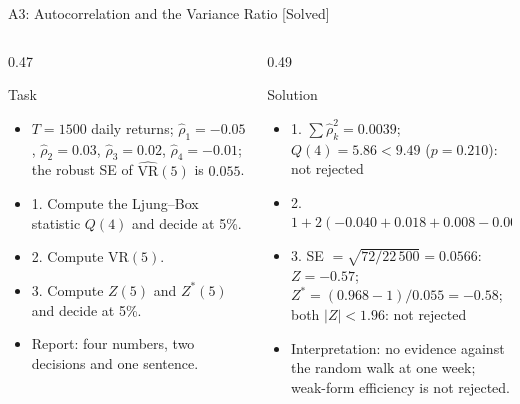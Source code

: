 \begin{frame}{A3: Autocorrelation and the Variance Ratio [Solved]}
\itemsize{\scriptsize}
\begin{columns}[T]
\begin{column}{0.47\textwidth}
\begin{block}{Task}
\begin{itemize}
    \item $T = 1500$ daily returns; $\hat\rho_1 = -0.05$, $\hat\rho_2 = 0.03$, $\hat\rho_3 = 0.02$, $\hat\rho_4 = -0.01$; the robust SE of $\widehat{\mathrm{VR}}(5)$ is $0.055$.
    \item 1. Compute the Ljung--Box statistic $Q(4)$ and decide at 5\%.
    \item 2. Compute $\mathrm{VR}(5)$.
    \item 3. Compute $Z(5)$ and $Z^*(5)$ and decide at 5\%.
    \item Report: four numbers, two decisions and one sentence.
\end{itemize}
\end{block}
\end{column}
\begin{column}{0.49\textwidth}
\begin{exampleblock}{Solution}
\begin{itemize}
    \item 1. $\sum\hat\rho_k^2 = 0.0039$; $Q(4) = 5.86 < 9.49$ ($p = 0.210$): not rejected
    \item 2. $1 + 2(-0.040 + 0.018 + 0.008 - 0.002) = 1 + 2 \times (-0.016) = 0.968$
    \item 3. SE $= \sqrt{72/22\,500} = 0.0566$: $Z = -0.57$; $Z^* = (0.968 - 1)/0.055 = -0.58$; both $|Z| < 1.96$: not rejected
    \item Interpretation: no evidence against the random walk at one week; weak-form efficiency is not rejected.
\end{itemize}
\end{exampleblock}
\end{column}
\end{columns}
\end{frame}

